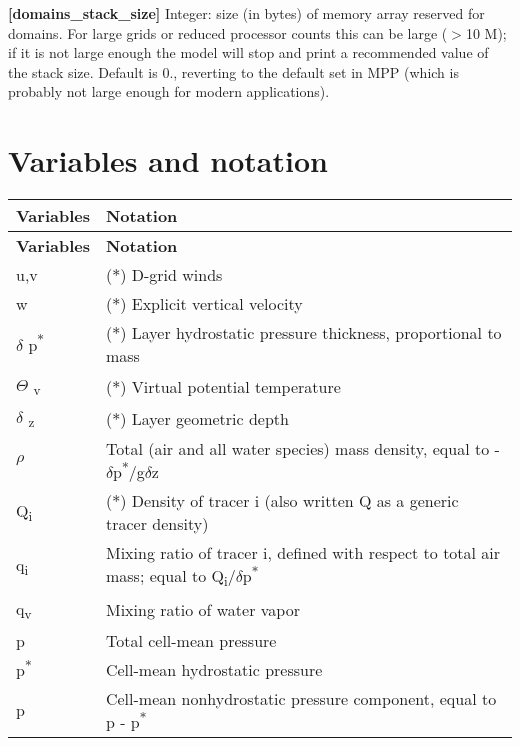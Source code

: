 {\bfseries \mbox{[}domains\+\_\+stack\+\_\+size\mbox{]}} Integer\+: size (in bytes) of memory array reserved for domains. For large grids or reduced processor counts this can be large ($>$10 M); if it is not large enough the model will stop and print a recommended value of the stack size. Default is 0., reverting to the default set in M\+PP (which is probably not large enough for modern applications). \hypertarget{variables}{}\section{Variables and notation}\label{variables}
\tabulinesep=1mm
\begin{longtabu} spread 0pt [c]{*{2}{|X[-1]}|}
\hline
\rowcolor{\tableheadbgcolor}\textbf{ Variables  }&\textbf{ Notation   }\\
\endfirsthead
\hline
\endfoot
\hline
\rowcolor{\tableheadbgcolor}\textbf{ Variables  }&\textbf{ Notation   }\\
\endhead
{\ttfamily u,v}  &($\ast$) D-\/grid winds   \\
{\ttfamily w}  &($\ast$) Explicit vertical velocity   \\
{$\delta$} p\textsuperscript{$\ast$}  &($\ast$) Layer hydrostatic pressure thickness, proportional to mass   \\
{$\Theta$} \textsubscript{v}  &($\ast$) Virtual potential temperature   \\
{$\delta$} \textsubscript{z}  &($\ast$) Layer geometric depth   \\
{$\rho$}  &Total (air and all water species) mass density, equal to -\/{$\delta$}p\textsuperscript{$\ast$}/g{$\delta$}z   \\
Q\textsubscript{i}  &($\ast$) Density of tracer i (also written Q as a generic tracer density)   \\
q\textsubscript{i}  &Mixing ratio of tracer i, defined with respect to total air mass; equal to Q\textsubscript{i}/{$\delta$}p\textsuperscript{$\ast$}   \\
q\textsubscript{v}  &Mixing ratio of water vapor   \\
p  &Total cell-\/mean pressure   \\
p\textsuperscript{$\ast$}  &Cell-\/mean hydrostatic pressure   \\
p\textquotesingle{}  &Cell-\/mean nonhydrostatic pressure component, equal to p -\/ p\textsuperscript{$\ast$}   \\

\end{longtabu}
